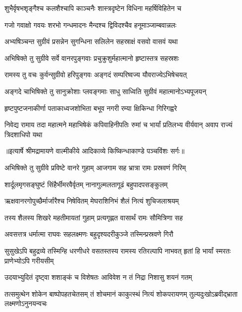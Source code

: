 \twolineshloka
{शुभैर्वृषभशृङ्गैश्च कलशैश्चापि काञ्चनैः}
{शास्त्रदृष्टेन विधिना महर्षिविहितेन च} %

\twolineshloka
{गजो गवाक्षो गवयः शरभो गन्धमादनः}
{मैन्दश्च द्विविदश्चैव हनूमाञ्जाम्बवान्नलः} %

\twolineshloka
{अभ्यषिञ्चन्त सुग्रीवं प्रसन्नेन सुगन्धिना}
{सलिलेन सहस्राक्षं वसवो वासवं यथा} %

\twolineshloka
{अभिषिक्ते तु सुग्रीवे सर्वे वानरपुङ्गवाः}
{प्रचुक्रुशुर्महात्मानो हृष्टास्तत्र सहस्रशः} %

\twolineshloka
{रामस्य तु वचः कुर्वन्सुग्रीवो हरिपुङ्गवः}
{अङ्गदं सम्परिष्वज्य यौवराज्येऽभिषेचयत्} %

\twolineshloka
{अङ्गदे चाभिषिक्ते तु सानुक्रोशाः प्लवङ्गमाः}
{साधु साध्विति सुग्रीवं महात्मानोऽभ्यपूजयन्} %

\twolineshloka
{हृष्टपुष्टजनाकीर्णा पताकाध्वजशोभिता}
{बभूव नगरी रम्या क्षिकिन्धा गिरिगह्वरे} %

\fourlineindentedshloka
{निवेद्य रामाय तदा महात्मने}
{महाभिषेकं कपिवाहिनीपतिः}
{रुमां च भार्यां प्रतिलभ्य वीर्यवान्}
{अवाप राज्यं त्रिदशाधिपो यथा} %


{॥इत्यार्षे श्रीमद्रामायणे वाल्मीकीये आदिकाव्ये किष्किन्धाकाण्डे पञ्चविंशः सर्गः॥}


\twolineshloka
{अभिषिक्ते तु सुग्रीवे प्रविष्टे वानरे गुहाम्}
{आजगाम सह भ्रात्रा रामः प्रस्रवणं गिरिम्} %

\twolineshloka
{शार्दूलमृगसङ्घुष्टं सिंहैर्भीमरवैर्वृतम्}
{नानागुल्मलतागूढं बहुपादपसङ्कुलम्} %

\twolineshloka
{ऋक्षवानरगोपुच्छैर्मार्जारैश्च निषेवितम्}
{मेघराशिनिभं शैलं नित्यं शुचिजलाश्रयम्} %

\twolineshloka
{तस्य शैलस्य शिखरे महतीमायतां गुहाम्}
{प्रत्यगृह्णत वासार्थं रामः सौमित्रिणा सह} %

\twolineshloka
{अवसत्तत्र धर्मात्मा राघवः सहलक्ष्मणः}
{बहुदृश्यदरीकुञ्जे तस्मिन्प्रस्रवणे गिरौ} %

\threelineshloka
{सुसुखेऽपि बहुद्रव्ये तस्मिन्हि धरणीधरे}
{वसतस्तस्य रामस्य रतिरल्पापि नाभवत्}
{हृतां हि भार्यां स्मरतः प्राणेभ्योऽपि गरीयसीम्} %

\twolineshloka
{उदयाभ्युदितं दृष्ट्वा शशाङ्कं च विशेषतः}
{आविवेश न तं निद्रा निशासु शयनं गतम्} %

\threelineshloka
{तत्समुत्थेन शोकेन बाष्पोपहतचेतसम्}
{तं शोचमानं काकुत्स्थं नित्यं शोकपरायणम्}
{तुल्यदुःखोऽब्रवीद्भ्राता लक्ष्मणोऽनुनयन्वचः} %

